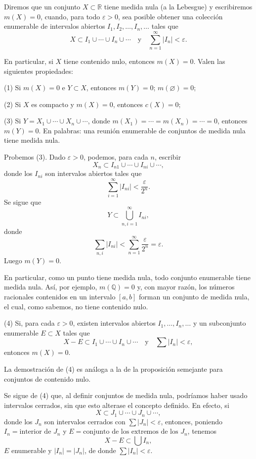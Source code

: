 \documentclass[12pt,oneside]{book}
\begin{document}
Diremos que un conjunto \(X \subset \mathbb{R}\) tiene medida nula (a la Lebesgue) y escribiremos \(m(X) = 0\), cuando, para todo \(\varepsilon > 0\), sea posible obtener una colección enumerable de intervalos abiertos \(I_1, I_2, \dots, I_n, \dots\) tales que
\[
X \subset I_1 \cup \cdots \cup I_n \cup \cdots
\quad \text{y} \quad
\sum_{n=1}^{\infty} |I_n| < \varepsilon.
\]

En particular, si \(X\) tiene contenido nulo, entonces \(m(X) = 0\). Valen las siguientes propiedades:

(1) Si \(m(X) = 0\) e \(Y \subset X\), entonces \(m(Y) = 0\); \(m(\varnothing) = 0\);

(2) Si \(X\) es compacto y \(m(X) = 0\), entonces \(c(X) = 0\);

(3) Si \(Y = X_1 \cup \cdots \cup X_n \cup \cdots\), donde \(m(X_1) = \cdots = m(X_n) = \cdots = 0\), entonces \(m(Y) = 0\). En palabras: una reunión enumerable de conjuntos de medida nula tiene medida nula.

Probemos (3). Dado \(\varepsilon > 0\), podemos, para cada \(n\), escribir
\[
X_n \subset I_{n1} \cup \cdots \cup I_{ni} \cup \cdots,
\]
donde los \(I_{ni}\) son intervalos abiertos tales que
\[
\sum_{i=1}^{\infty} |I_{ni}| < \frac{\varepsilon}{2^n}.
\]
Se sigue que
\[
Y \subset \bigcup_{n,i=1}^{\infty} I_{ni},
\]
donde
\[
\sum_{n,i} |I_{ni}| < \sum_{n=1}^{\infty} \frac{\varepsilon}{2^n} = \varepsilon.
\]
Luego \(m(Y) = 0\).

En particular, como un punto tiene medida nula, todo conjunto enumerable tiene medida nula. Así, por ejemplo, \(m(\mathbb{Q}) = 0\) y, con mayor razón, los números racionales contenidos en un intervalo \([a, b]\) forman un conjunto de medida nula, el cual, como sabemos, no tiene contenido nulo.

(4) Si, para cada \(\varepsilon > 0\), existen intervalos abiertos \(I_1, \dots, I_n, \dots\) y un subconjunto enumerable \(E \subset X\) tales que
\[
X - E \subset I_1 \cup \cdots \cup I_n \cup \cdots
\quad \text{y} \quad
\sum |I_n| < \varepsilon,
\]
entonces \(m(X) = 0\).

La demostración de (4) es análoga a la de la proposición semejante para conjuntos de contenido nulo.

Se sigue de (4) que, al definir conjuntos de medida nula, podríamos haber usado intervalos cerrados, sin que esto alterase el concepto definido. En efecto, si
\[
X \subset J_1 \cup \cdots \cup J_n \cup \cdots,
\]
donde los \(J_n\) son intervalos cerrados con \(\sum |J_n| < \varepsilon\), entonces, poniendo \(I_n = \text{interior de } J_n\) y \(E = \text{conjunto de los extremos de los } J_n\), tenemos
\[
X - E \subset \bigcup I_n,
\]
\(E\) enumerable y \(|I_n| = |J_n|\), de donde \(\sum |I_n| < \varepsilon\).
\end{document}
